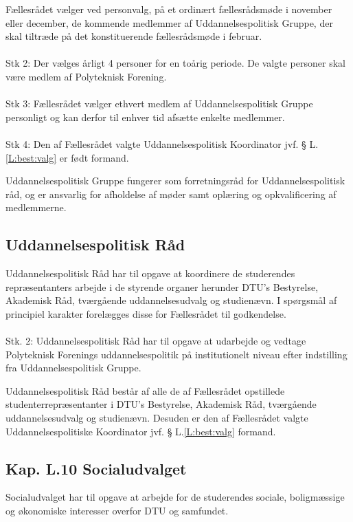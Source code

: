 \begin{list}
\item Fællesrådet vælger ved personvalg, på et ordinært fællesrådsmøde i november eller december, de kommende medlemmer af Uddannelsespolitisk Gruppe, der skal tiltræde på det konstituerende fællesrådsmøde i februar.
\\
\\
Stk 2: Der vælges årligt 4 personer for en toårig periode. De valgte personer skal være medlem af Polyteknisk Forening.
\\
\\
Stk 3: Fællesrådet vælger ethvert medlem af Uddannelsespolitisk Gruppe personligt og kan derfor til enhver tid afsætte enkelte medlemmer.
\\
\\
Stk 4: Den af Fællesrådet valgte Uddannelsespolitisk Koordinator jvf. § L.\ref{L:best:valg} er født formand.

\item Uddannelsespolitisk Gruppe fungerer som forretningsråd for Uddannelsespolitisk råd, og er ansvarlig for afholdelse af møder samt oplæring og opkvalificering af medlemmerne.



\subsection{Uddannelsespolitisk Råd}
\item Uddannelsespolitisk Råd har til opgave at koordinere de studerendes repræsentanters arbejde i de styrende organer herunder DTU’s Bestyrelse, Akademisk Råd, tværgående uddannelsesudvalg og studienævn. I spørgsmål af principiel karakter forelægges disse for Fællesrådet til godkendelse.
\\
\\
Stk. 2: Uddannelsespolitisk Råd har til opgave at udarbejde og vedtage Polyteknisk Forenings
uddannelsespolitik på institutionelt niveau efter indstilling fra Uddannelsespolitisk Gruppe.

\item
Uddannelsespolitisk Råd består af alle de af Fællesrådet opstillede studenterrepræsentanter i DTU’s
Bestyrelse, Akademisk Råd, tværgående uddannelsesudvalg og studienævn. Desuden er den af Fællesrådet
valgte Uddannelsespolitiske Koordinator jvf. § L.\ref{L:best:valg} formand.


\subsection{Kap. L.10 Socialudvalget}
\item Socialudvalget har til opgave at arbejde for de studerendes sociale, boligmæssige og økonomiske interesser overfor DTU og samfundet.


\end{list}
